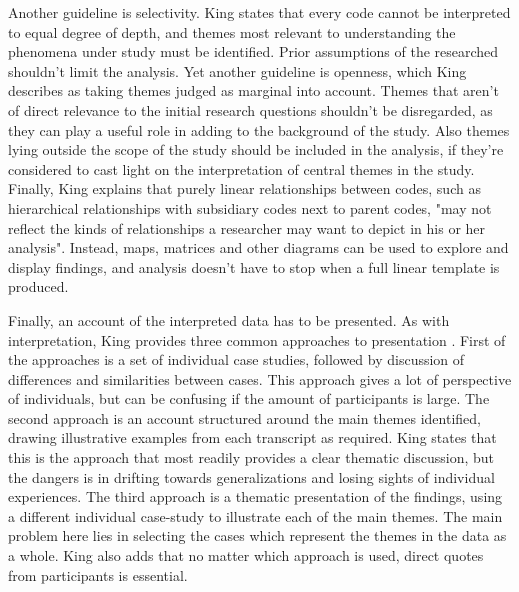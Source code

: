 \documentclass[english, grading]{tktltiki2}
\theoremstyle{definition}
\theoremstyle{remark}
\begin{document}
Another guideline is selectivity. King states that every code cannot be interpreted to equal degree of depth, and themes most relevant to understanding the phenomena under study must be identified. Prior assumptions of the researched shouldn't limit the analysis. Yet another guideline is openness, which King describes as taking themes judged as marginal into account. Themes that aren't of direct relevance to the initial research questions shouldn't be disregarded, as they can play a useful role in adding to the background of the study. Also themes lying outside the scope of the study should be included in the analysis, if they're considered to cast light on the interpretation of central themes in the study. Finally, King explains that purely linear relationships between codes, such as hierarchical relationships with subsidiary codes next to parent codes, "may not reflect the kinds of relationships a researcher may want to depict in his or her analysis". Instead, maps, matrices and other diagrams can be used to explore and display findings, and analysis doesn't have to stop when a full linear template is produced.

Finally, an account of the interpreted data has to be presented. As with interpretation, King provides three common approaches to presentation \cite{king2004using}. First of the approaches is a set of individual case studies, followed by discussion of differences and similarities between cases. This approach gives a lot of perspective of individuals, but can be confusing if the amount of participants is large. The second approach is an account structured around the main themes identified, drawing illustrative examples from each transcript as required. King states that this is the approach that most readily provides a clear thematic discussion, but the dangers is in drifting towards generalizations and losing sights of individual experiences. The third approach is a thematic presentation of the findings, using a different individual case-study to illustrate each of the main themes. The main problem here lies in selecting the cases which represent the themes in the data as a whole. King also adds that no matter which approach is used, direct quotes from participants is essential.  
\end{document}
